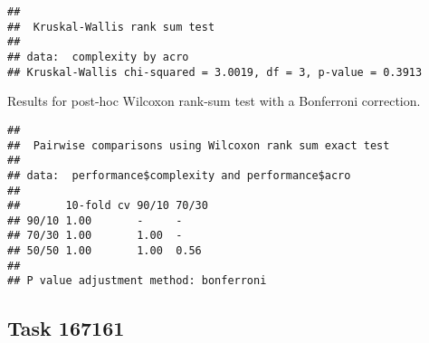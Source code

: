 \documentclass[
]{book}
\newenvironment{Shaded}{\begin{snugshade}}{\end{snugshade}}
\newcommand{\AttributeTok}[1]{\textcolor[rgb]{0.13,0.29,0.53}{#1}}
\newcommand{\ConstantTok}[1]{\textcolor[rgb]{0.56,0.35,0.01}{#1}}
\newcommand{\FunctionTok}[1]{\textcolor[rgb]{0.13,0.29,0.53}{\textbf{#1}}}
\newcommand{\NormalTok}[1]{#1}
\newcommand{\SpecialCharTok}[1]{\textcolor[rgb]{0.81,0.36,0.00}{\textbf{#1}}}
\newcommand{\StringTok}[1]{\textcolor[rgb]{0.31,0.60,0.02}{#1}}
\begin{document}
\begin{verbatim}
## 
##  Kruskal-Wallis rank sum test
## 
## data:  complexity by acro
## Kruskal-Wallis chi-squared = 3.0019, df = 3, p-value = 0.3913
\end{verbatim}

Results for post-hoc Wilcoxon rank-sum test with a Bonferroni correction.

\begin{Shaded}
\end{Shaded}

\begin{verbatim}
## 
##  Pairwise comparisons using Wilcoxon rank sum exact test 
## 
## data:  performance$complexity and performance$acro 
## 
##       10-fold cv 90/10 70/30
## 90/10 1.00       -     -    
## 70/30 1.00       1.00  -    
## 50/50 1.00       1.00  0.56 
## 
## P value adjustment method: bonferroni
\end{verbatim}

\hypertarget{task-167161-1}{%
\subsection{Task 167161}\label{task-167161-1}}
\end{document}
